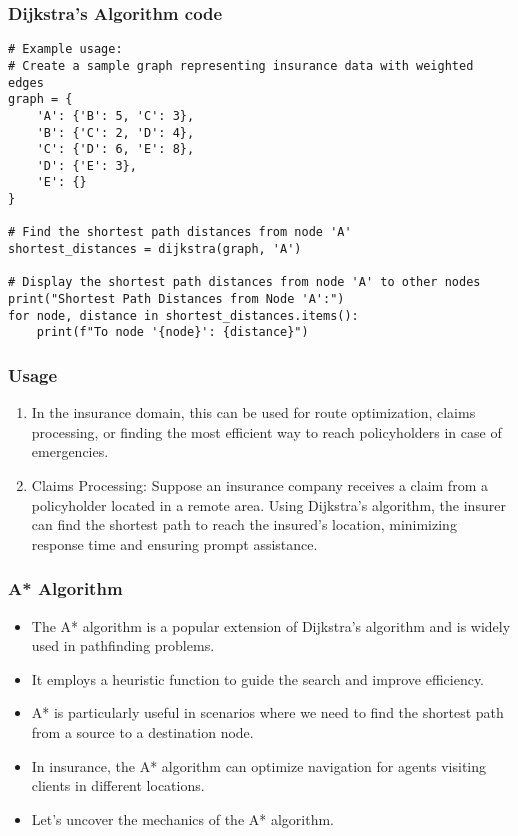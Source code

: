 \begin{frame}[fragile]\frametitle{Dijkstra's Algorithm code}
{\tiny
\begin{lstlisting}
# Example usage:
# Create a sample graph representing insurance data with weighted edges
graph = {
    'A': {'B': 5, 'C': 3},
    'B': {'C': 2, 'D': 4},
    'C': {'D': 6, 'E': 8},
    'D': {'E': 3},
    'E': {}
}

# Find the shortest path distances from node 'A'
shortest_distances = dijkstra(graph, 'A')

# Display the shortest path distances from node 'A' to other nodes
print("Shortest Path Distances from Node 'A':")
for node, distance in shortest_distances.items():
    print(f"To node '{node}': {distance}")

\end{lstlisting}
}
\end{frame}

\begin{frame}[fragile]\frametitle{Usage}
\begin{enumerate}
\item In the insurance domain, this can be used for route optimization, claims processing, or finding the most efficient way to reach policyholders in case of emergencies.
\item  Claims Processing: Suppose an insurance company receives a claim from a policyholder located in a remote area. Using Dijkstra's algorithm, the insurer can find the shortest path to reach the insured's location, minimizing response time and ensuring prompt assistance.
\end{enumerate}
\end{frame}



\begin{frame}[fragile]\frametitle{A* Algorithm}
\begin{itemize}
\item The A* algorithm is a popular extension of Dijkstra's algorithm and is widely used in pathfinding problems.
\item It employs a heuristic function to guide the search and improve efficiency.
\item A* is particularly useful in scenarios where we need to find the shortest path from a source to a destination node.
\item In insurance, the A* algorithm can optimize navigation for agents visiting clients in different locations.
\item Let's uncover the mechanics of the A* algorithm.
\end{itemize}
\end{frame}

